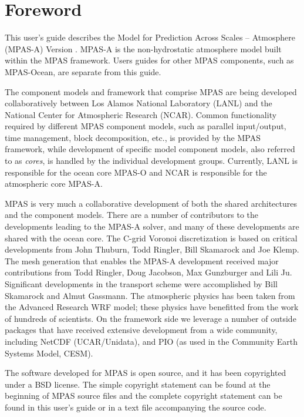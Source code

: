 \chapter*{Foreword}
\label{chap:foreword}

This user's guide describes the Model for Prediction Across Scales -- Atmosphere
(MPAS-A) Version \version.   MPAS-A is the non-hydrostatic atmosphere model built within the MPAS
framework. Users guides for other MPAS components, such as MPAS-Ocean, are separate from this guide.

The component models and framework that comprise MPAS are being developed collaboratively between Los Alamos National
Laboratory (LANL) and the National Center for Atmospheric Research (NCAR).
Common functionality required by different MPAS component models, such as parallel
input/output, time management, block decomposition, etc., is provided by the
MPAS framework, while development of specific model component models, also referred to as {\it cores}, is handled by the
individual development groups.  Currently, LANL is responsible for the ocean core MPAS-O and NCAR is responsible for the atmospheric core MPAS-A.

MPAS is very much a collaborative development of both the shared architectures and the component models.  There are a number of contributors to the developments leading to the MPAS-A solver, and many of these developments are shared with the ocean core.  The C-grid Voronoi discretization is based on critical developments from John Thuburn, Todd Ringler, Bill Skamarock and Joe Klemp.  The mesh generation that enables the MPAS-A development received major contributions from Todd Ringler, Doug Jacobson, Max Gunzburger and Lili Ju.  Significant developments in the transport scheme were accomplished by Bill Skamarock and Almut Gassmann.  The atmospheric physics has been taken from the Advanced Research WRF model; these physics have benefitted from the work of hundreds of scientists.  On the framework side we leverage a number of outside packages that have received extensive development from a wide community, including NetCDF (UCAR/Unidata), and PIO (as used in the Community Earth Systems Model, CESM).

The software developed for MPAS is open source, and it has been copyrighted under a BSD license.  The simple copyright statement can be found at the beginning of MPAS source files and the complete copyright statement can be found in this user's guide or in a text file accompanying the source code.

